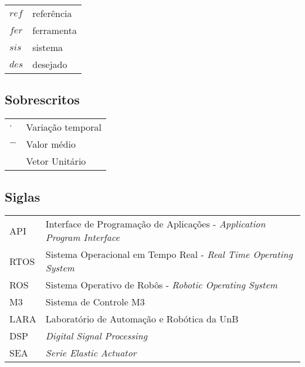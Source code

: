\begin{tabular}{p{}p{}}
$ref$  & referência \tabularnewline
$fer$  & ferramenta \tabularnewline
$sis$  & sistema \tabularnewline
$des$  & desejado\tabularnewline
\end{tabular}


\subsection*{Sobrescritos}

\begin{tabular}{p{}p{}}
$\cdot$  & Variação temporal \tabularnewline
$-$  & Valor médio \tabularnewline
$^{}$  & Vetor Unitário \tabularnewline
\end{tabular}


\subsection*{Siglas}

\begin{tabular}{p{}p{}}
API & Interface de Programação de Aplicações - \textit{Application Program Interface}\tabularnewline
RTOS & Sistema Operacional em Tempo Real -  \textit{Real Time Operating System}\tabularnewline
ROS & Sistema Operativo de Robôs - \textit{Robotic Operating System}\tabularnewline
M3 & Sistema de Controle M3\tabularnewline
LARA & Laboratório de Automação e Robótica da UnB\tabularnewline
DSP & \textit{Digital Signal Processing}\tabularnewline
SEA & \textit{Serie Elastic Actuator}\tabularnewline
\end{tabular}
